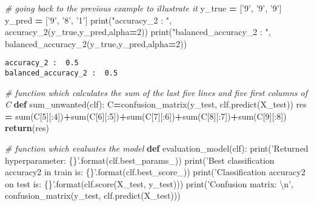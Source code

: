 \documentclass[10pt,a4paper]{article}
\newenvironment{Shaded}{\begin{snugshade}}{\end{snugshade}}
\newcommand{\BuiltInTok}[1]{#1}
\newcommand{\CharTok}[1]{\textcolor[rgb]{0.31,0.60,0.02}{#1}}
\newcommand{\CommentTok}[1]{\textcolor[rgb]{0.56,0.35,0.01}{\textit{#1}}}
\newcommand{\ControlFlowTok}[1]{\textcolor[rgb]{0.13,0.29,0.53}{\textbf{#1}}}
\newcommand{\DecValTok}[1]{\textcolor[rgb]{0.00,0.00,0.81}{#1}}
\newcommand{\KeywordTok}[1]{\textcolor[rgb]{0.13,0.29,0.53}{\textbf{#1}}}
\newcommand{\NormalTok}[1]{#1}
\newcommand{\OperatorTok}[1]{\textcolor[rgb]{0.81,0.36,0.00}{\textbf{#1}}}
\newcommand{\SpecialCharTok}[1]{\textcolor[rgb]{0.00,0.00,0.00}{#1}}
\newcommand{\StringTok}[1]{\textcolor[rgb]{0.31,0.60,0.02}{#1}}
\theoremstyle{break}
\begin{document}
\begin{Shaded}
\begin{Highlighting}[]
\CommentTok{# going back to the previous example to illustrate it}
\NormalTok{y_true }\OperatorTok{=}\NormalTok{ [}\StringTok{'9'}\NormalTok{, }\StringTok{'9'}\NormalTok{, }\StringTok{'9'}\NormalTok{] }
\NormalTok{y_pred }\OperatorTok{=}\NormalTok{ [}\StringTok{'9'}\NormalTok{, }\StringTok{'8'}\NormalTok{, }\StringTok{'1'}\NormalTok{] }
\BuiltInTok{print}\NormalTok{(}\StringTok{"accuracy_2 : "}\NormalTok{, accuracy_2(y_true,y_pred,alpha}\OperatorTok{=}\DecValTok{2}\NormalTok{))}
\BuiltInTok{print}\NormalTok{(}\StringTok{"balanced_accuracy_2 : "}\NormalTok{, balanced_accuracy_2(y_true,y_pred,alpha}\OperatorTok{=}\DecValTok{2}\NormalTok{)) }
\end{Highlighting}
\end{Shaded}

\begin{verbatim}
accuracy_2 :  0.5
balanced_accuracy_2 :  0.5
\end{verbatim}

\begin{Shaded}
\begin{Highlighting}[]
\CommentTok{# function which calculates the sum of the last five lines and five first columns of C}
\KeywordTok{def}\NormalTok{ sum_unwanted(clf):}
\NormalTok{    C}\OperatorTok{=}\NormalTok{confusion_matrix(y_test, clf.predict(X_test))}
\NormalTok{    res }\OperatorTok{=} \BuiltInTok{sum}\NormalTok{(C[}\DecValTok{5}\NormalTok{][:}\DecValTok{4}\NormalTok{])}\OperatorTok{+}\BuiltInTok{sum}\NormalTok{(C[}\DecValTok{6}\NormalTok{][:}\DecValTok{5}\NormalTok{])}\OperatorTok{+}\BuiltInTok{sum}\NormalTok{(C[}\DecValTok{7}\NormalTok{][:}\DecValTok{6}\NormalTok{])}\OperatorTok{+}\BuiltInTok{sum}\NormalTok{(C[}\DecValTok{8}\NormalTok{][:}\DecValTok{7}\NormalTok{])}\OperatorTok{+}\BuiltInTok{sum}\NormalTok{(C[}\DecValTok{9}\NormalTok{][:}\DecValTok{8}\NormalTok{])}
    \ControlFlowTok{return}\NormalTok{(res)}
\end{Highlighting}
\end{Shaded}

\begin{Shaded}
\begin{Highlighting}[]
\CommentTok{# function which evaluates the model}
\KeywordTok{def}\NormalTok{ evaluation_model(clf):}
    \BuiltInTok{print}\NormalTok{(}\StringTok{'Returned hyperparameter: }\SpecialCharTok{\{\}}\StringTok{'}\NormalTok{.}\BuiltInTok{format}\NormalTok{(clf.best_params_))}
    \BuiltInTok{print}\NormalTok{(}\StringTok{'Best classification accuracy2 in train is: }\SpecialCharTok{\{\}}\StringTok{'}\NormalTok{.}\BuiltInTok{format}\NormalTok{(clf.best_score_))}
    \BuiltInTok{print}\NormalTok{(}\StringTok{'Classification accuracy2 on test is: }\SpecialCharTok{\{\}}\StringTok{'}\NormalTok{.}\BuiltInTok{format}\NormalTok{(clf.score(X_test, y_test)))}
    \BuiltInTok{print}\NormalTok{(}\StringTok{'Confusion matrix: }\CharTok{\textbackslash{}n}\StringTok{'}\NormalTok{, confusion_matrix(y_test, clf.predict(X_test)))}
\end{Highlighting}
\end{Shaded}
\end{document}
